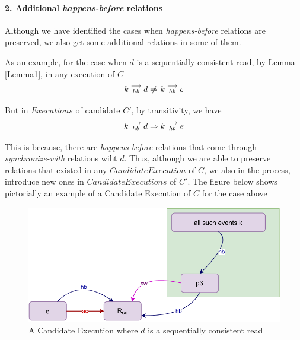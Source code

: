 
\paragraph{2. Additional \textit{happens-before} relations}
    Although we have identified the cases when \textit{happens-before} relations are preserved, we also get some additional relations in some of them.

    As an example, for the case when $d$ is a sequentially consistent read, by Lemma \ref{Lemma1}, in any execution of $C$
    \[
        \reln{k}{hb}{d} \centernot\Rightarrow \reln{k}{hb}{e} 
    \]

    But in $Executions$ of candidate $C'$, by transitivity, we have 
    \[
        k\stackrel{\longrightarrow}{_{hb}}d \Rightarrow k\stackrel{\longrightarrow}{_{hb}}e 
    \]

    This is because, there are \textit{happens-before} relations that come through \textit{synchronize-with} relations wiht $d$. Thus, although we are able to preserve relations that existed in any $Candidate Execution$ of $C$, we also in the process, introduce new ones in $Candidate Executions$ of $C'$. The figure below shows pictorially an example of a Candidate Execution of $C$ for the case above 

    \begin{figure}[H]
        \centering
        \includegraphics[scale=0.7]{5.InstructionReordering/4.ValidReorderingCandidate/ProofParts/Part2/part2(c).pdf}
        \caption{A Candidate Execution where $d$ is a sequentially consistent read}
        \label{fig:my_label}
    \end{figure}

